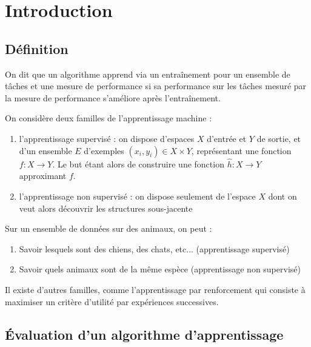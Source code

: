 
\section{Introduction}

\subsection{Définition}

\begin{definition}
	On dit que un algorithme apprend via un entraînement pour un ensemble de tâches et une mesure de performance si sa performance sur les tâches mesuré par la mesure de performance s’améliore après l'entraînement.
\end{definition}

\begin{definition}
	\label{15-def-1}
	On considère deux familles de l’apprentissage machine :
	\begin{enumerate}
		\item l’apprentissage supervisé : on dispose d’espaces $X$ d’entrée et $Y$ de sortie, et d’un ensemble $E$ d’exemples $(x_i , y_i ) \in X \times Y$, représentant une fonction $f : X \to Y$. Le but étant alors de construire une fonction $\hat{h} : X \to Y$ approximant $f$.
		\item l’apprentissage non supervisé : on dispose seulement de l’espace $X$  dont on veut alors découvrir les structures sous-jacente
	\end{enumerate}
\end{definition}

\begin{example}
	Sur un ensemble de données sur des animaux, on peut :\begin{enumerate}
		\item Savoir lesquels sont des chiens, des chats, etc... (apprentissage supervisé)
		\item Savoir quels animaux sont de la même espèce (apprentissage non supervisé)
	\end{enumerate}
\end{example}

\begin{rem}
	Il existe d’autres familles, comme l’apprentissage par renforcement qui consiste à maximiser un critère d’utilité par expériences successives.
\end{rem}

\subsection{Évaluation d'un algorithme d'apprentissage}
\label{15-I-2}

